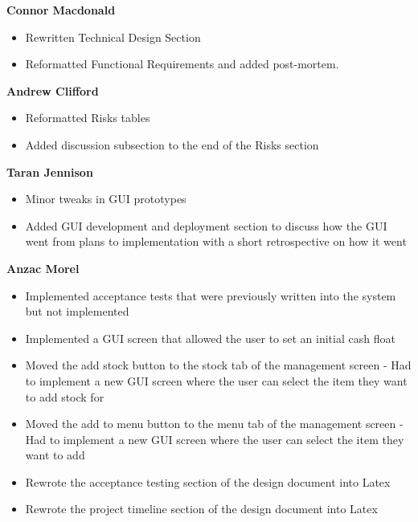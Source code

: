 
\textbf{Connor Macdonald}
\begin{itemize}
	\item Rewritten Technical Design Section
	\item Reformatted Functional Requirements and added post-mortem.
\end{itemize}

\textbf{Andrew Clifford}
\begin{itemize}
	\item Reformatted Risks tables
	\item Added discussion subsection to the end of the Risks section
\end{itemize}

\textbf{Taran Jennison}
\begin{itemize}
	\item Minor tweaks in GUI prototypes
	\item Added GUI development and deployment section to discuss how the GUI went from plans to implementation with a short retrospective on how it went
\end{itemize}

\noindent\textbf{Anzac Morel}
\begin{itemize}
	\item Implemented acceptance tests that were previously written into the system but not implemented
	\item Implemented a GUI screen that allowed the user to set an initial cash float
	\item Moved the add stock button to the stock tab of the management screen - Had to implement a new GUI screen where the user can select the item they want to add stock for
	\item Moved the add to menu button to the menu tab of the management screen - Had to implement a new GUI screen where the user can select the item they want to add
	\item Rewrote the acceptance testing section of the design document into Latex
	\item Rewrote the project timeline section of the design document into Latex
\end{itemize}